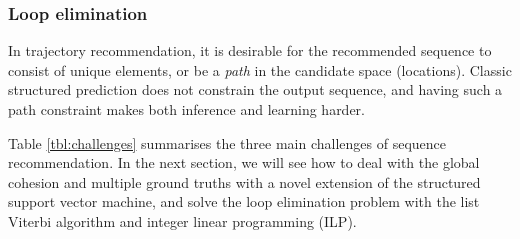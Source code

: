 \subsubsection{Loop elimination}
In trajectory recommendation, it is desirable for the recommended sequence to consist of unique elements,
or be a {\em path} in the candidate space (\eg locations).
Classic structured prediction does not constrain the output sequence, and having such a
path constraint makes both inference and learning harder.


Table \ref{tbl:challenges} summarises the three main challenges of sequence recommendation.
In the next section, we will see how to deal with the global cohesion and multiple ground truths with a novel extension of
the structured support vector machine,
and solve the loop elimination problem with the list Viterbi algorithm and integer linear programming (ILP).
